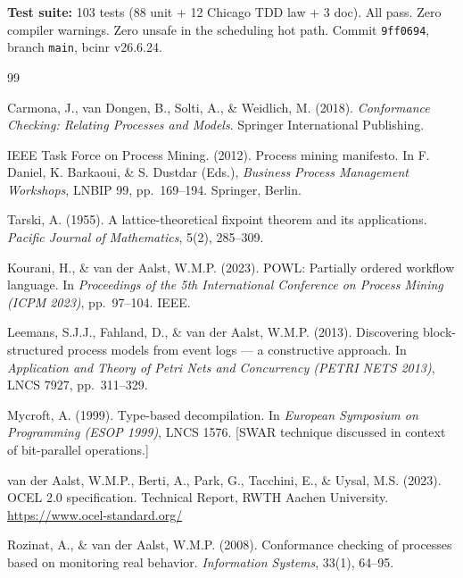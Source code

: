 \documentclass[12pt,a4paper]{article}
\theoremstyle{definition}
\theoremstyle{remark}
\begin{document}
\bigskip
\noindent\textbf{Test suite:} 103 tests (88 unit + 12 Chicago TDD law + 3 doc). All pass.
Zero compiler warnings. Zero unsafe in the scheduling hot path.
Commit \texttt{9ff0694}, branch \texttt{main}, bcinr v26.6.24.


\begin{thebibliography}{99}

Carmona, J., van Dongen, B., Solti, A., \& Weidlich, M. (2018).
\textit{Conformance Checking: Relating Processes and Models}.
Springer International Publishing.

IEEE Task Force on Process Mining. (2012).
Process mining manifesto.
In F. Daniel, K. Barkaoui, \& S. Dustdar (Eds.),
\textit{Business Process Management Workshops}, LNBIP 99, pp.~169--194.
Springer, Berlin.

Tarski, A. (1955).
A lattice-theoretical fixpoint theorem and its applications.
\textit{Pacific Journal of Mathematics}, 5(2), 285--309.

Kourani, H., \& van der Aalst, W.M.P. (2023).
POWL: Partially ordered workflow language.
In \textit{Proceedings of the 5th International Conference on Process Mining (ICPM 2023)},
pp.~97--104. IEEE.

Leemans, S.J.J., Fahland, D., \& van der Aalst, W.M.P. (2013).
Discovering block-structured process models from event logs --- a constructive approach.
In \textit{Application and Theory of Petri Nets and Concurrency (PETRI NETS 2013)},
LNCS 7927, pp.~311--329.

Mycroft, A. (1999).
Type-based decompilation.
In \textit{European Symposium on Programming (ESOP 1999)}, LNCS 1576.
[SWAR technique discussed in context of bit-parallel operations.]

van der Aalst, W.M.P., Berti, A., Park, G., Tacchini, E., \& Uysal, M.S. (2023).
OCEL 2.0 specification.
Technical Report, RWTH Aachen University.
\url{https://www.ocel-standard.org/}

Rozinat, A., \& van der Aalst, W.M.P. (2008).
Conformance checking of processes based on monitoring real behavior.
\textit{Information Systems}, 33(1), 64--95.


\end{thebibliography}
\end{document}
